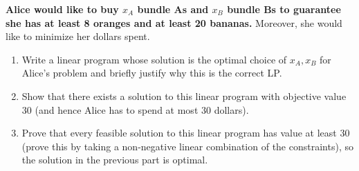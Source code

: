 \documentclass[10pt,letterpaper]{article}
\begin{document}
\textbf{Alice would like to buy $x_A$ bundle As and $x_B$ bundle Bs to guarantee she has at least 8 oranges and at least 20 bananas.} Moreover, she would like to  minimize her dollars spent. 

\begin{enumerate}

\item  Write a linear program whose solution is the optimal choice of $x_A, x_B$ for Alice's problem and briefly justify why this is the correct LP.






\item  Show that there exists a solution to this linear program with objective value $30$ (and hence Alice has to spend at most $30$ dollars).




\item  Prove that every feasible solution to this linear program has value at least $30$  (prove this by taking a non-negative linear combination of the constraints), so the solution in the previous part is optimal.

\
\end{enumerate}
\end{document}
